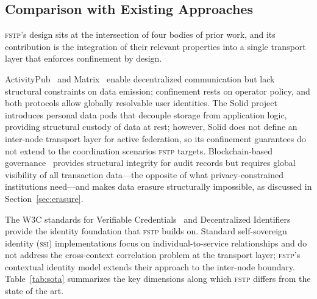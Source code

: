 \documentclass[12pt]{article}
\newcommand{\FSTP}{\textsc{fstp}}
\begin{document}
	\subsection{Comparison with Existing Approaches}
	\label{sec:comparison}
	
	\FSTP{}'s design sits at the intersection of four bodies of prior work,
	and its contribution is the integration of their relevant properties
	into a single transport layer that enforces confinement by design.
	
	ActivityPub~\cite{w3c2018activitypub} and Matrix~\cite{matrix2022spec}
	enable decentralized communication but lack structural constraints on
	data emission; confinement rests on operator policy, and both protocols
	allow globally resolvable user identities. The Solid
	project~\cite{berners2016solid} introduces personal data pods that
	decouple storage from application logic, providing structural custody
	of data at rest; however, Solid does not define an inter-node transport
	layer for active federation, so its confinement guarantees do not
	extend to the coordination scenarios \FSTP{} targets.
	Blockchain-based governance~\cite{hassan2021dao} provides structural
	integrity for audit records but requires global visibility of all
	transaction data---the opposite of what privacy-constrained institutions
	need---and makes data erasure structurally impossible, as discussed in
	Section~\ref{sec:erasure}.
	
	The W3C standards for Verifiable Credentials~\cite{w3c2022vc} and
	Decentralized Identifiers~\cite{w3c2022did} provide the identity
	foundation that \FSTP{} builds on. Standard self-sovereign identity
	(\textsc{ssi}) implementations focus on individual-to-service
	relationships and do not address the cross-context correlation problem
	at the transport layer; \FSTP{}'s contextual identity model extends
	their approach to the inter-node boundary. Table~\ref{tab:sota}
	summarizes the key dimensions along which \FSTP{} differs from the
	state of the art.
	
\end{document}
